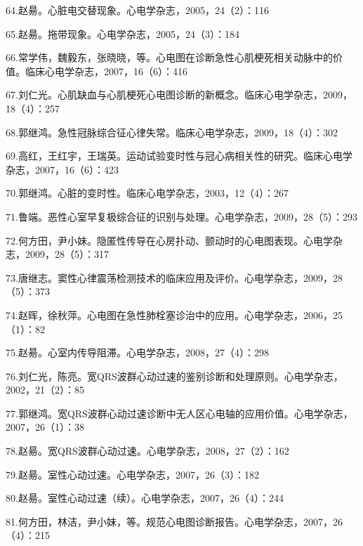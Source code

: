 \documentclass[
  12pt,
  twoside,
  banjiao]{ctexbook}
\begin{document}
64.赵昜。心脏电交替现象。心电学杂志，2005，24（2）：116

65.赵昜。拖带现象。心电学杂志，2005，24（3）：184

66.常学伟，魏毅东，张晓晓，等。心电图在诊断急性心肌梗死相关动脉中的价值。临床心电学杂志，2007，16（6）：416

67.刘仁光。心肌缺血与心肌梗死心电图诊断的新概念。临床心电学杂志，2009，18（4）：257

68.郭继鸿。急性冠脉综合征心律失常。临床心电学杂志，2009，18（4）：302

69.高红，王红宇，王瑞英。运动试验变时性与冠心病相关性的研究。临床心电学杂志，2007，16（6）：423

70.郭继鸿。心脏的变时性。临床心电学杂志，2003，12（4）：267

71.鲁端。恶性心室早复极综合征的识别与处理。心电学杂志，2009，28（5）：293

72.何方田，尹小妹。隐匿性传导在心房扑动、颤动时的心电图表现。心电学杂志，2009，28（5）：317

73.唐继志。窦性心律震荡检测技术的临床应用及评价。心电学杂志，2009，28（5）：373

74.赵晖，徐秋萍。心电图在急性肺栓塞诊治中的应用。心电学杂志，2006，25（1）：82

75.赵昜。心室内传导阻滞。心电学杂志，2008，27（4）：298

76.刘仁光，陈亮。宽QRS波群心动过速的鉴别诊断和处理原则。心电学杂志，2002，21（2）：85

77.郭继鸿。宽QRS波群心动过速诊断中无人区心电轴的应用价值。心电学杂志，2007，26（1）：38

78.赵昜。宽QRS波群心动过速。心电学杂志，2008，27（2）：162

79.赵昜。室性心动过速。心电学杂志，2007，26（3）：182

80.赵昜。室性心动过速（续）。心电学杂志，2007，26（4）：244

81.何方田，林洁，尹小妹，等。规范心电图诊断报告。心电学杂志，2007，26（4）：215
\end{document}
